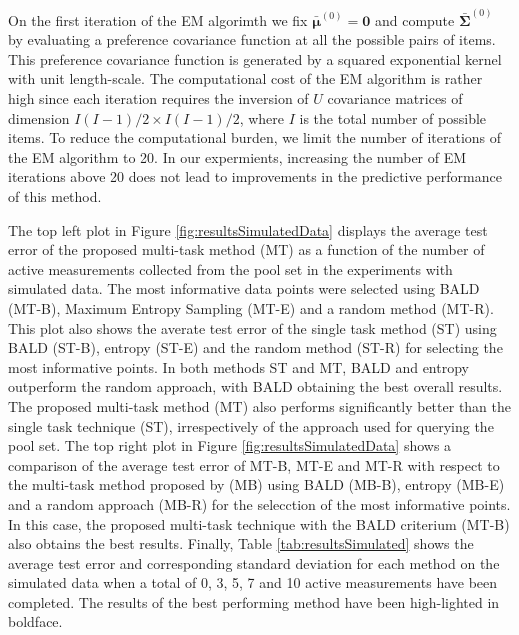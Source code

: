 On the first iteration of the EM algorimth we fix $\bar{\bm \mu}^{(0)} = \bm 0$ and compute $\bar{\bm \Sigma}^{(0)}$ 
by evaluating a preference covariance function at all the possible pairs of items. This preference covariance function
is generated by a squared exponential kernel with unit length-scale. 
The computational cost of the EM algorithm is rather high
since each iteration requires the inversion of $U$ covariance matrices of dimension $I(I-1)/2 \times I(I-1)/2$,
where $I$ is the total number of possible items. To reduce the computational burden, we limit
the number of iterations of the EM algorithm to 20. In our expermients, increasing the number of EM iterations 
above 20 does not lead to improvements in the predictive performance of this method.

The top left plot in Figure \ref{fig:resultsSimulatedData} displays the average test error of the proposed multi-task method (MT) as a
function of the number of active measurements collected from the pool set in the experiments with simulated data.
The most informative data points were selected using BALD (MT-B), Maximum Entropy Sampling (MT-E) and a random method (MT-R). 
This plot also shows the averate test error of the single task method (ST) using
BALD (ST-B), entropy (ST-E) and the random method (ST-R) for selecting the most informative points.
In both methods ST and MT, BALD and entropy outperform the random approach, with BALD obtaining the best overall results.
The proposed multi-task method (MT) also performs significantly better than the single task technique (ST), irrespectively
of the approach used for querying the pool set. The top right plot in Figure \ref{fig:resultsSimulatedData} shows a comparison of the
average test error of MT-B, MT-E and MT-R with respect to the multi-task method proposed by \cite{Birlutiu2011} (MB) using
BALD (MB-B), entropy (MB-E) and a random approach (MB-R) for the selecction of the most informative points.
In this case, the proposed multi-task technique with the BALD criterium (MT-B) also obtains the best results.
Finally, Table \ref{tab:resultsSimulated} shows the average test error and corresponding standard deviation for each method
on the simulated data when a total of 0, 3, 5, 7 and 10 active measurements have been completed. The results of the best performing method
have been high-lighted in boldface.



